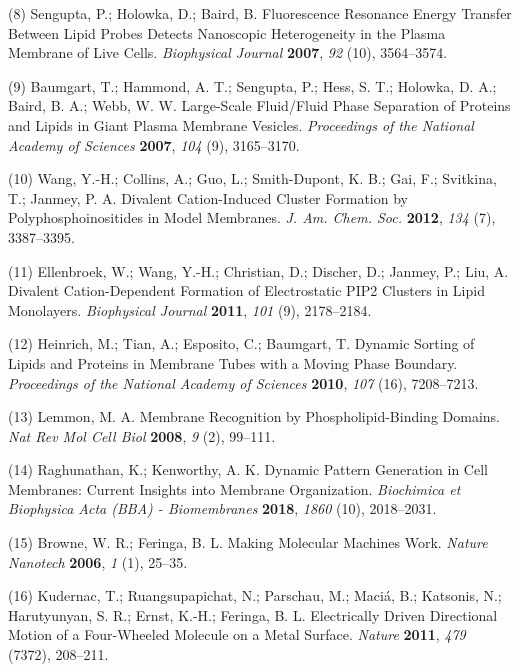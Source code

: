 \documentclass[11pt,notitlepage]{article}
\begin{document}
\leavevmode\hypertarget{ref-BzP79Vj9}{}%
(8) Sengupta, P.; Holowka, D.; Baird, B. Fluorescence Resonance Energy
Transfer Between Lipid Probes Detects Nanoscopic Heterogeneity in the
Plasma Membrane of Live Cells. \emph{Biophysical Journal} \textbf{2007},
\emph{92} (10), 3564--3574.

\leavevmode\hypertarget{ref-aiu6Tmil}{}%
(9) Baumgart, T.; Hammond, A. T.; Sengupta, P.; Hess, S. T.; Holowka, D.
A.; Baird, B. A.; Webb, W. W. Large-Scale Fluid/Fluid Phase Separation
of Proteins and Lipids in Giant Plasma Membrane Vesicles.
\emph{Proceedings of the National Academy of Sciences} \textbf{2007},
\emph{104} (9), 3165--3170.

\leavevmode\hypertarget{ref-LhOwGz4k}{}%
(10) Wang, Y.-H.; Collins, A.; Guo, L.; Smith-Dupont, K. B.; Gai, F.;
Svitkina, T.; Janmey, P. A. Divalent Cation-Induced Cluster Formation by
Polyphosphoinositides in Model Membranes. \emph{J. Am. Chem. Soc.}
\textbf{2012}, \emph{134} (7), 3387--3395.

\leavevmode\hypertarget{ref-10CqL9t0a}{}%
(11) Ellenbroek, W.; Wang, Y.-H.; Christian, D.; Discher, D.; Janmey,
P.; Liu, A. Divalent Cation-Dependent Formation of Electrostatic PIP2
Clusters in Lipid Monolayers. \emph{Biophysical Journal} \textbf{2011},
\emph{101} (9), 2178--2184.

\leavevmode\hypertarget{ref-XIltXoGI}{}%
(12) Heinrich, M.; Tian, A.; Esposito, C.; Baumgart, T. Dynamic Sorting
of Lipids and Proteins in Membrane Tubes with a Moving Phase Boundary.
\emph{Proceedings of the National Academy of Sciences} \textbf{2010},
\emph{107} (16), 7208--7213.

\leavevmode\hypertarget{ref-uyKE7bWV}{}%
(13) Lemmon, M. A. Membrane Recognition by Phospholipid-Binding Domains.
\emph{Nat Rev Mol Cell Biol} \textbf{2008}, \emph{9} (2), 99--111.

\leavevmode\hypertarget{ref-2TfZ4zWV}{}%
(14) Raghunathan, K.; Kenworthy, A. K. Dynamic Pattern Generation in
Cell Membranes: Current Insights into Membrane Organization.
\emph{Biochimica et Biophysica Acta (BBA) - Biomembranes} \textbf{2018},
\emph{1860} (10), 2018--2031.

\leavevmode\hypertarget{ref-10FsKpWBI}{}%
(15) Browne, W. R.; Feringa, B. L. Making Molecular Machines Work.
\emph{Nature Nanotech} \textbf{2006}, \emph{1} (1), 25--35.

\leavevmode\hypertarget{ref-OAnfwOYX}{}%
(16) Kudernac, T.; Ruangsupapichat, N.; Parschau, M.; Maciá, B.;
Katsonis, N.; Harutyunyan, S. R.; Ernst, K.-H.; Feringa, B. L.
Electrically Driven Directional Motion of a Four-Wheeled Molecule on a
Metal Surface. \emph{Nature} \textbf{2011}, \emph{479} (7372), 208--211.
\end{document}
